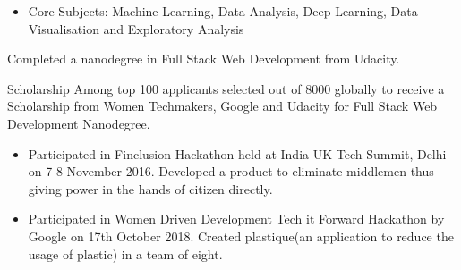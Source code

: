 
\begin{itemize}
\item Core Subjects: Machine Learning, Data Analysis, Deep Learning, Data Visualisation and Exploratory Analysis
\end{itemize}
\divider




 {Completed a nanodegree in Full Stack Web Development from Udacity.}

\divider

\cvachievement{\faTrophy}
{Scholarship}
{ Among top 100 applicants selected out of 8000 globally to receive a Scholarship from Women Techmakers, Google and Udacity for Full Stack Web Development Nanodegree.}
\divider

{\begin{itemize}
\item Participated in Finclusion Hackathon held at India-UK Tech Summit, Delhi on 7-8 November 2016. Developed a product to eliminate middlemen thus giving power in the hands of citizen directly. 
\item Participated in Women Driven Development Tech it Forward Hackathon by Google on 17th October 2018. Created plastique(an application to reduce the usage of plastic) in a team of eight.  
\end{itemize}}


\divider





